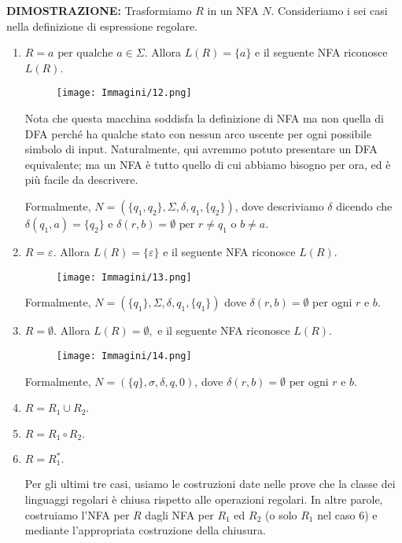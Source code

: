 \documentclass{article}
\begin{document}
\textbf{DIMOSTRAZIONE:}
Trasformiamo $R$ in un NFA $N$. Consideriamo i sei casi nella definizione di espressione regolare.
\begin{enumerate}
    \item $R = a \text{ per qualche } a \in \Sigma.$ Allora $L(R) = \{a\}$ e il seguente NFA riconosce $L(R)$. 
        \begin{figure}[H]
            \centering
            \texttt{[image: Immagini/12.png]}
            \label{fig:your_image1}
        \end{figure}
        Nota che questa macchina soddisfa la definizione di NFA ma non quella di DFA perché ha qualche stato con nessun arco uscente per ogni possibile simbolo di input. Naturalmente, qui avremmo potuto presentare un DFA equivalente; ma un NFA è tutto quello di cui abbiamo bisogno per ora, ed è più facile da descrivere.
        
        Formalmente, $N = (\{q_{1},q_{2}\},\Sigma,\delta,q_{1},\{q_{2}\})$, dove descriviamo $\delta$ dicendo che $\delta(q_{1},a) = \{q_2\}$ e $\delta(r,b) = \emptyset \text{ per }r\neq q_{1}$ o $b \neq a.$
    \item $R = \varepsilon.$ Allora $L(R) = \{\varepsilon\}$ e il seguente NFA riconosce $L(R)$.
    \begin{figure}[H]
        \centering
        \texttt{[image: Immagini/13.png]}
        \label{fig:your_image1}
    \end{figure}
    Formalmente, $N = (\{q_{1}\},\Sigma,\delta,q_{1},\{q_{1}\})$ dove $\delta(r,b) = \emptyset$ per ogni $r$ e $b$.
    \item $R = \emptyset.$ Allora $L(R) = \emptyset,$ e il seguente NFA riconosce $L(R)$.
    \begin{figure}[H]
        \centering
        \texttt{[image: Immagini/14.png]}
        \label{fig:your_image}
    \end{figure}
    Formalmente, $N = (\{q\},\sigma,\delta,q,0)$, dove $\delta(r,b) = \emptyset \text{ per ogni } r \text{ e } b.$
    \item $R = R_{1}\cup R_{2}.$
    \item $R = R_{1}\circ R_{2}.$
    \item $R = R^{*}_{1}.$
    
    Per gli ultimi tre casi, usiamo le costruzioni date nelle prove che la classe dei linguaggi regolari è chiusa rispetto alle operazioni regolari. In altre parole, costruiamo l'NFA per $R$ dagli NFA per $R_{1}$ ed $R_{2}$ (o solo $R_{1}$ nel caso 6) e mediante l'appropriata costruzione della chiusura.
\end{enumerate}
\end{document}
